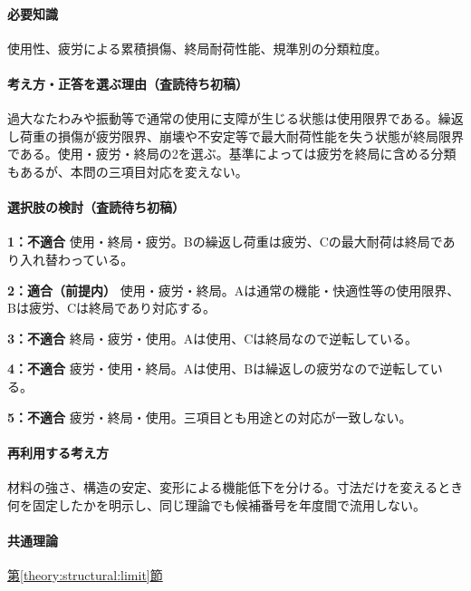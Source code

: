 \paragraph{必要知識} 使用性、疲労による累積損傷、終局耐荷性能、規準別の分類粒度。

\paragraph{考え方・正答を選ぶ理由（査読待ち初稿）} 過大なたわみや振動等で通常の使用に支障が生じる状態は使用限界である。繰返し荷重の損傷が疲労限界、崩壊や不安定等で最大耐荷性能を失う状態が終局限界である。使用・疲労・終局の2を選ぶ。基準によっては疲労を終局に含める分類もあるが、本問の三項目対応を変えない。

\paragraph{選択肢の検討（査読待ち初稿）}\mbox{}\par

\noindent\textbf{1：不適合} 使用・終局・疲労。Bの繰返し荷重は疲労、Cの最大耐荷は終局であり入れ替わっている。\par

\noindent\textbf{2：適合（前提内）} 使用・疲労・終局。Aは通常の機能・快適性等の使用限界、Bは疲労、Cは終局であり対応する。\par

\noindent\textbf{3：不適合} 終局・疲労・使用。Aは使用、Cは終局なので逆転している。\par

\noindent\textbf{4：不適合} 疲労・使用・終局。Aは使用、Bは繰返しの疲労なので逆転している。\par

\noindent\textbf{5：不適合} 疲労・終局・使用。三項目とも用途との対応が一致しない。\par

\paragraph{再利用する考え方} 材料の強さ、構造の安定、変形による機能低下を分ける。寸法だけを変えるとき何を固定したかを明示し、同じ理論でも候補番号を年度間で流用しない。

\paragraph{共通理論} \hyperref[theory:structural:limit]{第\ref*{theory:structural:limit}節}

